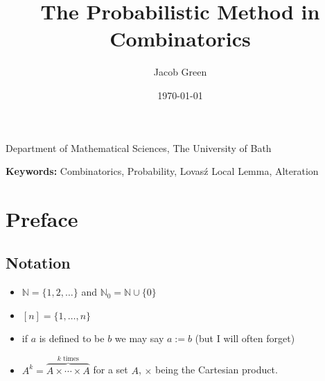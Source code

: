 \documentclass{article}
\title{The Probabilistic Method in Combinatorics}
\author{Jacob Green}
\date{\today}
\newcommand{\subtitle}{}
\newcommand{\institution}{Department of Mathematical Sciences, The University of Bath}
\newcommand{\keywords}{Combinatorics, Probability, Lovas\'{z} Local Lemma, Alteration}
\begin{document}
\begin{titlepage}
    \centering
    
    {\Huge \bfseries \thetitle \par}
    \vspace{0.5cm}
    
    {\Large \subtitle \par}
    \vspace{1cm}
    
    {\large \theauthor \par}
    {\institution \par}
    \vspace{1cm}
    
    {\large \thedate \par}
    \vspace{1.5cm}
    
    \begin{abstract}
        \lipsum[10]
    \end{abstract}
    \vspace{1cm}
    
    \textbf{Keywords:} \keywords
    \vfill %
    
    \textit{}
\end{titlepage}

\newpage 

\setcounter{page}{1} %

\section*{Preface}

\subsection*{Notation}

\begin{itemize}
    \item $\mathbb{N} = \{1, 2, \dots\}$ and $\mathbb{N}_0 = \mathbb{N} \cup \{0\}$
    \item $[n] = \{1, \dots, n\}$
    \item if $a$ is defined to be $b$ we may say $a := b$ (but I will often forget)
    \item $A^k = \overbrace{A \times \cdots \times A}^{k \text{ times}}$ for a set $A$, $\times$ being the Cartesian product. 
\end{itemize}
\end{document}
